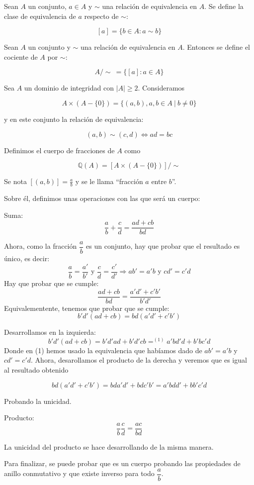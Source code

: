 \begin{ndef}
  Sean $A$ un conjunto, $a\in A$ y $\sim$ una relación de equivalencia en $A$. Se define la clase de equivalencia
  de $a$ respecto de $\sim$:

  \[
     [a] = \{ b \in A : a \sim b \}
  \]
\end{ndef}

\begin{ndef}
  Sean $A$ un conjunto y $\sim$ una relación de equivalencia en $A$. Entonces se define el cociente de $A$ por $\sim$:

  \[
     A/\sim \ = \{ [a] : a \in A\}
  \]
\end{ndef}

\begin{ndef}
  Sea $A$ un dominio de integridad con $|A| \geq 2$. Consideramos

  $$A\times (A-\{0\}) = \{(a,b), a,b \in A\ |\ b\neq 0\}$$

  y en este conjunto la relación de equivalencia:

  \[
     (a,b) \sim (c,d) \iff ad = bc
  \]

  Definimos el cuerpo de fracciones de $A$ como

  $$\mathbb{Q}(A) = [A\times (A-\{0\})]/\sim$$

    Se nota $[(a,b)] = \displaystyle\frac{a}{b}$ y se le llama ``fracción $a$ entre $b$''.

  Sobre él, definimos unas operaciones con las que será un cuerpo:
\begin{nlist}
	\item Suma: \[\frac{a}{b}+ \frac{c}{d} = \frac{ad + cb}{bd}\]

Ahora, como la fracción $\dfrac{a}{b}$ es un conjunto, hay que probar que el resultado es único, es decir:
\[
\frac{a}{b}= \frac{a'}{b'} \text{ y } \frac{c}{d}= \frac{c'}{d'}  \Rightarrow ab' = a'b \text{ y } cd' = c'd
\]
Hay que probar que se cumple:
\[
\frac{ad+cb}{bd} = \frac{a'd'+c'b'}{b'd'}
\]
Equivalementente, tenemos que probar que se cumple:
\[
b'd'(ad+cb) = bd(a'd'+c'b')
\]

Desarrollamos en la izquierda:
\[
b'd'(ad+cb) = b'd'ad + b'd'cb =^{(1)} a'bd'd + b'bc'd
\]
Donde en (1) hemos usado la equivalencia que habíamos dado de $ab' = a'b$ y $cd' = c'd$. Ahora, desarollamos el producto de la derecha y veremos que es igual al resultado obtenido

\[
bd(a'd'+c'b') = bda'd' + bdc'b' = a'bdd' + bb'c'd
\]

Probando la unicidad.

    \item Producto: \[\frac{a}{b} \frac{c}{d} = \frac{ac}{bd}\]

La unicidad del producto se hace desarrollando de la misma manera.
\end{nlist}



Para finalizar, se puede probar que es un cuerpo probando las propiedades de anillo conmutativo y que existe inverso para todo $\dfrac{a}{b}$.
\end{ndef}

